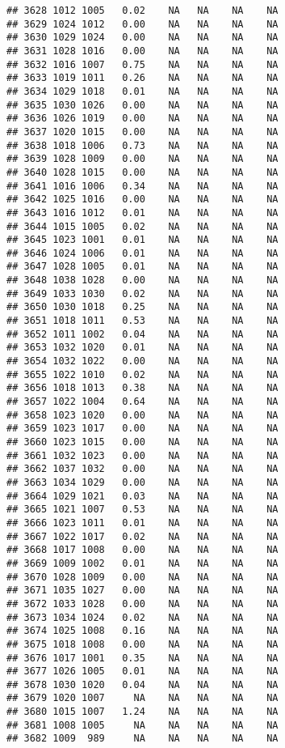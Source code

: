 \documentclass{article}\usepackage{graphicx, color}
\makeatletter
\newenvironment{kframe}{%
 \def\at@end@of@kframe{}%
 \ifinner\ifhmode%
  \def\at@end@of@kframe{\end{minipage}}%
  \begin{minipage}{\columnwidth}%
 \fi\fi%
 \def\FrameCommand##1{\hskip\@totalleftmargin \hskip-\fboxsep
 \colorbox{shadecolor}{##1}\hskip-\fboxsep
     \hskip-\linewidth \hskip-\@totalleftmargin \hskip\columnwidth}%
 \MakeFramed {\advance\hsize-\width
   \@totalleftmargin\z@ \linewidth\hsize
   \@setminipage}}%
 {\par\unskip\endMakeFramed%
 \at@end@of@kframe}
\newenvironment{knitrout}{}{} %
\makeatother
\begin{document}
\begin{knitrout}
\begin{kframe}
\begin{verbatim}
## 3628 1012 1005   0.02    NA   NA    NA    NA
## 3629 1024 1012   0.00    NA   NA    NA    NA
## 3630 1029 1024   0.00    NA   NA    NA    NA
## 3631 1028 1016   0.00    NA   NA    NA    NA
## 3632 1016 1007   0.75    NA   NA    NA    NA
## 3633 1019 1011   0.26    NA   NA    NA    NA
## 3634 1029 1018   0.01    NA   NA    NA    NA
## 3635 1030 1026   0.00    NA   NA    NA    NA
## 3636 1026 1019   0.00    NA   NA    NA    NA
## 3637 1020 1015   0.00    NA   NA    NA    NA
## 3638 1018 1006   0.73    NA   NA    NA    NA
## 3639 1028 1009   0.00    NA   NA    NA    NA
## 3640 1028 1015   0.00    NA   NA    NA    NA
## 3641 1016 1006   0.34    NA   NA    NA    NA
## 3642 1025 1016   0.00    NA   NA    NA    NA
## 3643 1016 1012   0.01    NA   NA    NA    NA
## 3644 1015 1005   0.02    NA   NA    NA    NA
## 3645 1023 1001   0.01    NA   NA    NA    NA
## 3646 1024 1006   0.01    NA   NA    NA    NA
## 3647 1028 1005   0.01    NA   NA    NA    NA
## 3648 1038 1028   0.00    NA   NA    NA    NA
## 3649 1033 1030   0.02    NA   NA    NA    NA
## 3650 1030 1018   0.25    NA   NA    NA    NA
## 3651 1018 1011   0.53    NA   NA    NA    NA
## 3652 1011 1002   0.04    NA   NA    NA    NA
## 3653 1032 1020   0.01    NA   NA    NA    NA
## 3654 1032 1022   0.00    NA   NA    NA    NA
## 3655 1022 1010   0.02    NA   NA    NA    NA
## 3656 1018 1013   0.38    NA   NA    NA    NA
## 3657 1022 1004   0.64    NA   NA    NA    NA
## 3658 1023 1020   0.00    NA   NA    NA    NA
## 3659 1023 1017   0.00    NA   NA    NA    NA
## 3660 1023 1015   0.00    NA   NA    NA    NA
## 3661 1032 1023   0.00    NA   NA    NA    NA
## 3662 1037 1032   0.00    NA   NA    NA    NA
## 3663 1034 1029   0.00    NA   NA    NA    NA
## 3664 1029 1021   0.03    NA   NA    NA    NA
## 3665 1021 1007   0.53    NA   NA    NA    NA
## 3666 1023 1011   0.01    NA   NA    NA    NA
## 3667 1022 1017   0.02    NA   NA    NA    NA
## 3668 1017 1008   0.00    NA   NA    NA    NA
## 3669 1009 1002   0.01    NA   NA    NA    NA
## 3670 1028 1009   0.00    NA   NA    NA    NA
## 3671 1035 1027   0.00    NA   NA    NA    NA
## 3672 1033 1028   0.00    NA   NA    NA    NA
## 3673 1034 1024   0.02    NA   NA    NA    NA
## 3674 1025 1008   0.16    NA   NA    NA    NA
## 3675 1018 1008   0.00    NA   NA    NA    NA
## 3676 1017 1001   0.35    NA   NA    NA    NA
## 3677 1026 1005   0.01    NA   NA    NA    NA
## 3678 1030 1020   0.04    NA   NA    NA    NA
## 3679 1020 1007     NA    NA   NA    NA    NA
## 3680 1015 1007   1.24    NA   NA    NA    NA
## 3681 1008 1005     NA    NA   NA    NA    NA
## 3682 1009  989     NA    NA   NA    NA    NA

\end{verbatim}
\end{kframe}
\end{knitrout}
\end{document}
